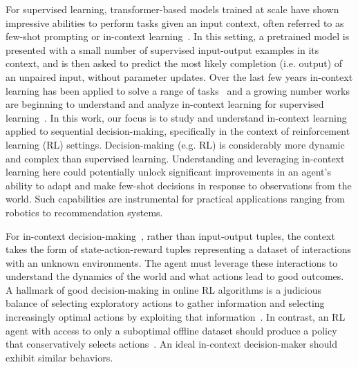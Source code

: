 


For supervised learning, transformer-based models trained at scale have shown impressive abilities to perform tasks given an input context, often referred to as few-shot prompting or in-context learning~\citep{brown2020language}. In this setting, a pretrained model is presented with a small number of supervised input-output examples in its context, and is then asked to predict the most likely completion (i.e. output) of an unpaired input, without parameter updates. Over the last few years in-context learning has been applied to solve a range of tasks~\citep{min2022rethinking} and a growing number works are beginning to understand and analyze in-context learning for supervised learning~\citep{chan2022data,garg2022can,razeghi2022impact,akyurek2022learning}.
In this work, our focus is to study and understand in-context learning applied to sequential decision-making, specifically in the context of reinforcement learning (RL) settings. Decision-making (e.g. RL) is considerably more dynamic and complex than supervised learning. Understanding and leveraging in-context learning here could potentially unlock significant improvements in an agent's ability to adapt and make few-shot decisions in response to observations from the world. Such capabilities are instrumental for practical applications ranging from robotics to recommendation systems. 

For in-context decision-making~\citep{laskin2022context,xu2022prompting,xu2023hyper}, rather than input-output tuples, the context takes the form of state-action-reward tuples representing a dataset of interactions with an unknown environments. The agent must leverage these interactions to understand the dynamics of the world and what actions lead to good outcomes. A hallmark of good decision-making in online RL algorithms is a judicious balance of selecting exploratory actions to gather information and selecting increasingly optimal actions by exploiting that information~\citep{sutton2018reinforcement}. In contrast, an RL agent with access to only a suboptimal offline dataset should produce a policy that conservatively selects actions~\citep{levine2020offline}. An ideal in-context decision-maker should exhibit similar behaviors.

